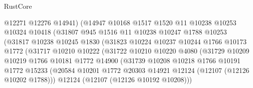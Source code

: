 \begin{lexlean}{RustCore}
\begin{coremodule}
                            @12271
                            @12276
                            @14941)
                          (@14947
                            @10168
                            @1517
                            @1520
                            @11
                            @10238
                            @10253
                            @10324
                            @10418
                            (@31807
                              @945
                              @1516
                              @11
                              @10238
                              @10247
                              @1788
                              @10253
                              (@31817
                                @10238
                                @10245
                                @1830
                                (@31823
                                  @10224
                                  @10237
                                  @10244
                                  @1766
                                  @10173
                                  @1772
                                  (@31717
                                    @10210
                                    @10222
                                    (@31722
                                      @10210
                                      @10220
                                      @4080
                                      (@31729
                                        @10209
                                        @10219
                                        @1766
                                        @10181
                                        @1772
                                        @14900
                                        (@31739
                                          @10208
                                          @10218
                                          @1766
                                          @10191
                                          @1772
                                          @15233
                                          (@20584
                                            @10201
                                            @1772
                                            @20303
                                            @14921
                                            @12124
                                            (@12107 (@12126 @10202 @1788)))
                                          @12124
                                          (@12107 (@12126 @10192 @10208)))

\end{coremodule}
\end{lexlean}
